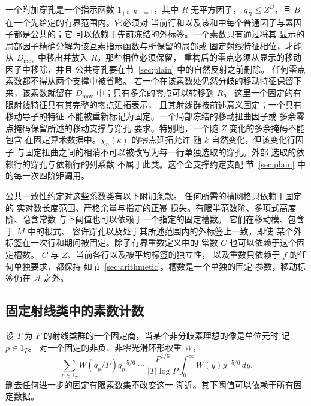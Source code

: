 一个附加穿孔是一个指示函数 $1_{(n,R)=1}$，其中 $R$ 无平方因子，
$q_R\le Z^B$，且 $B$ 在一个先给定的有界范围内。它必须对
当前行和以及该和中每个普通因子与素因子都是公共的；它
可以依赖于先前冻结的外标签。一个素数只有通过将其
显示的局部因子精确分解为该互素指示函数与所保留的局部或
固定射线特征相位，才能从 $D_{\mathrm{mov}}$ 中移出并放入 $R$。那些相位必须保留，
重构后的零点必须从显示的移动因子中移除，并且
公共穿孔要在节~\ref{sec:plain} 中的自然反射之前删除。
任何零点素数都不得从两个支撑中被省略。
若一个在该素数处仍然分歧的移动特征保留下来，该素数就留在
$D_{\mathrm{mov}}$ 中；只有多余的零点可以转移到 $R$。
这里一个固定的有限射线特征具有其完整的零点延拓表示，
且其射线群按前述意义固定；一个具有移动导子的特征
不能被重新标记为固定。一个局部冻结的移动扭曲因子或
多余零点掩码保留所述的移动支撑与穿孔
要求。特别地，一个随 $Z$ 变化的多余掩码不能包含
在固定算术数据中。$\chi_n(k)$ 的零点延拓允许
随 $k$ 自然变化，但该变化行因子
与固定扭曲之间的相消不可以被改写为每一行单独选取的穿孔。外部
选取的依赖行的穿孔与依赖行的列系数
不属于此类。这个全支撑约定支配
节~\ref{sec:plain} 中的每一次四阶矩调用。

公共一致性约定对这些系数类有以下附加条款。
任何所需的槽网格只依赖于固定的
实对数长度范围、严格余量与指定的正幂
损失。有限半范数阶、多项式高度阶、隐含常数
与下阈值也可以依赖于一个指定的固定槽数。
它们在移动模、包含于 $M$ 中的根式、
容许穿孔以及处于其所述范围内的外标签上一致，即使
某个外标签在一次行和期间被固定。除子有界重数定义中的
常数 $C$ 也可以依赖于这个固定槽数。
$C$ 与 $Z$、当前各行以及被平均标签的独立性，
以及重数只依赖于 $f$ 的任何单独要求，都保持
如节~\ref{sec:arithmetic}。槽数是一个单独的固定
参数，移动标签仍在 $\mathcal A$ 之外。

\subsection{固定射线类中的素数计数}

\begin{lemma}[固定射线素数正规化因子]\label{lem:ray-prime-normalizer}
设 $T$ 为 $F$ 的射线类群的一个固定商，当某个非分歧素理想的像是单位元时
记 $p\in1_T$。
对一个固定的非负、非零光滑环形权重 $W$，
\begin{equation}\label{eq:ray-prime-normalizer}
 \sum_{p\in1_T}W(q_p/P)q_p^{-5/6}
 \sim\frac{P^{1/6}}{|T|\log P}
      \int_0^\infty W(y)y^{-5/6}\,dy.
\end{equation}
删去任何进一步的固定有限素数集不改变这一
渐近。其下阈值可以依赖于所有固定数据。
\end{lemma}

